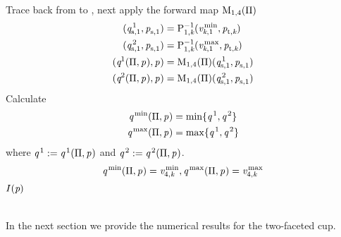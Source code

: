\begin{algorithm}
\begin{algorithmic}[1]
       \Else 
{}
                 \State Trace back from  to , next apply the forward map $\mathrm{M}_{1,4}(\Pi)$
\begin{equation*}
\begin{aligned}
(\textit{q}_{\textrm{s,} \textit{$1$}}^{\,1}, \textit{p}_{\textrm{s,} \textit{$1$}})& = \mathrm{P}_{{1,\textit{k}}}^{-1}(\textit{v}_{\textit{k},1 }^\textrm{\,min}, \textit{p}_{\textrm{t,} \textit{\textit{k}}})  \\
(\textit{q}_{\textrm{s,} \textit{$1$}}^{\,2}, \textit{p}_{\textrm{s,} \textit{$1$}}) & =\mathrm{P}_{{1,\textit{k}}}^{-1}(\textit{v}_{\textit{k}, 1}^\textrm{\,max}, \textit{p}_{\textrm{t,} \textit{\textit{k}}})\\
(\textit{q}_{\textrm{} \textit{}}^{1}(\Pi, \textit{p}_{\textrm{} \textit{}}), \textit{p}_{\textrm{} \textit{}})&= \mathrm{M}_{1,4}(\Pi)(\textit{q}_{\textrm{s,} \textit{$1$}}^{\,1}, \textit{p}_{\textrm{s,} \textit{$1$}})\\
(\textit{q}_{\textrm{} \textit{}}^{2}(\Pi, \textit{p}_{\textrm{} \textit{}}), \textit{p}_{\textrm{} \textit{}})&= \mathrm{M}_{1,4}(\Pi)(\textit{q}_{\textrm{s,} \textit{$1$}}^{\,2}, \textit{p}_{\textrm{s,} \textit{$1$}})
\end{aligned}
\end{equation*}
\State Calculate
\begin{equation*}
\begin{aligned}
\textit{q}_{\textrm{} \textit{}}^\textrm{\,min}(\Pi,\textit{p}_{\textrm{} \textit{}})&= \min\{\textit{q}_{\textrm{} \textit{}}^{\,1}, \textit{q}_{\textrm{} \textit{}}^{\,2}\} \\ 
\textit{q}_{\textrm{} \textit{}}^\textrm{\,max}(\Pi,\textit{p}_{\textrm{} \textit{}})&= \max\{\textit{q}_{\textrm{} \textit{}}^{\,1}, \textit{q}_{\textrm{} \textit{}}^{\,2}\}
\end{aligned}
\end{equation*}
\State where $\textit{q}_{\textrm{} \textit{}}^{\,1} := \textit{q}_{\textrm{} \textit{}}^{\,1}(\Pi, \textit{p}_{\textrm{} \textit{}})$ and $\textit{q}_{\textrm{} \textit{}}^{\,2} := \textit{q}_{\textrm{} \textit{}}^{\,2}(\Pi, \textit{p}_{\textrm{} \textit{}})$.
                 \State{}
                 \Else
                 \begin{equation*}
                       \textit{q}^\textrm{\,min}(\Pi, \textit{p}_{\textrm{} \textit{}}) = \textit{v}_{4, \textit{k}}^\textrm{\,min}, 
                       \textit{q}^\textrm{\,max}(\Pi, \textit{p}_{\textrm{} \textit{}}) = \textit{v}_{4, \textit{k}}^\textrm{\,max}
                       \end{equation*}
                  \State{}
              \EndIf    
\Else \pagebreak
\State \Return $I(\textit{p})$
\EndIf
        \EndIf
     \EndIf
\EndFor
\EndProcedure
\end{algorithmic}
\end{algorithm}
 \\ \indent In the next section we provide the numerical results for the two-faceted cup. 
